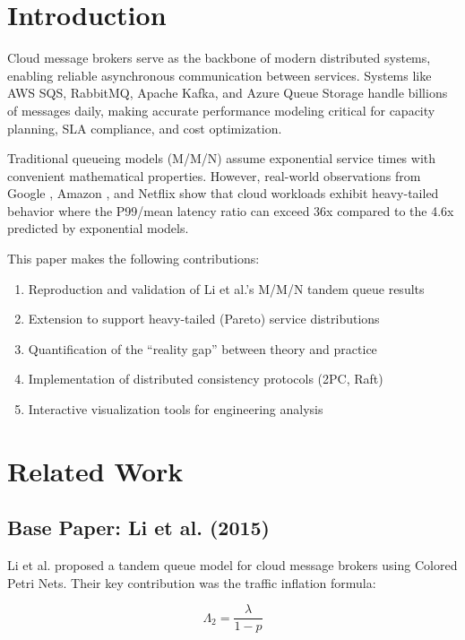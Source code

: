 \documentclass[conference,twocolumn]{IEEEtran}
\begin{document}
\section{Introduction}

Cloud message brokers serve as the backbone of modern distributed systems, enabling reliable asynchronous communication between services. Systems like AWS SQS, RabbitMQ, Apache Kafka, and Azure Queue Storage handle billions of messages daily, making accurate performance modeling critical for capacity planning, SLA compliance, and cost optimization.

Traditional queueing models (M/M/N) assume exponential service times with convenient mathematical properties. However, real-world observations from Google \cite{dean2013}, Amazon \cite{decandia2007}, and Netflix show that cloud workloads exhibit heavy-tailed behavior where the P99/mean latency ratio can exceed 36x compared to the 4.6x predicted by exponential models.

This paper makes the following contributions:
\begin{enumerate}[leftmargin=*]
    \item Reproduction and validation of Li et al.'s M/M/N tandem queue results
    \item Extension to support heavy-tailed (Pareto) service distributions
    \item Quantification of the ``reality gap'' between theory and practice
    \item Implementation of distributed consistency protocols (2PC, Raft)
    \item Interactive visualization tools for engineering analysis
\end{enumerate}

\section{Related Work}

\subsection{Base Paper: Li et al. (2015)}

Li et al. \cite{li2015} proposed a tandem queue model for cloud message brokers using Colored Petri Nets. Their key contribution was the traffic inflation formula:

\begin{equation}
\Lambda_2 = \frac{\lambda}{1-p}
\end{equation}
\end{document}
